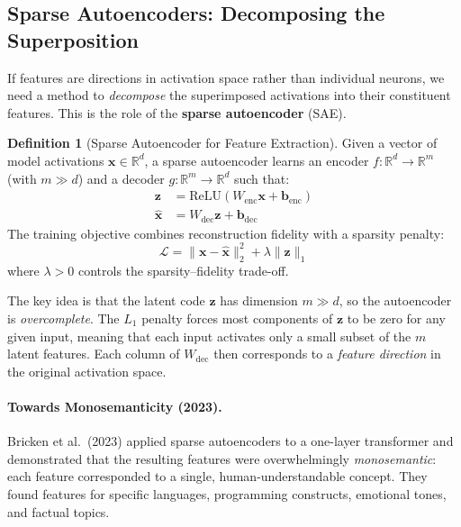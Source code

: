 \documentclass[11pt, a4paper]{article}
\theoremstyle{definition}
\newtheorem{definition}{Definition}[section]
\theoremstyle{plain}
\begin{document}
\subsection{Sparse Autoencoders: Decomposing the Superposition}
\label{sec:sae}

If features are directions in activation space rather than individual
neurons, we need a method to \emph{decompose} the superimposed
activations into their constituent features.  This is the role of the
\textbf{sparse autoencoder} (SAE).

\begin{definition}[Sparse Autoencoder for Feature Extraction]
Given a vector of model activations $\mathbf{x} \in \mathbb{R}^d$, a
sparse autoencoder learns an encoder $f: \mathbb{R}^d \to \mathbb{R}^m$
(with $m \gg d$) and a decoder $g: \mathbb{R}^m \to \mathbb{R}^d$ such
that:
\begin{align}
  \mathbf{z} &= \text{ReLU}(W_{\text{enc}} \mathbf{x} + \mathbf{b}_{\text{enc}})
  \label{eq:sae_enc} \\
  \hat{\mathbf{x}} &= W_{\text{dec}} \mathbf{z} + \mathbf{b}_{\text{dec}}
  \label{eq:sae_dec}
\end{align}
The training objective combines reconstruction fidelity with a sparsity
penalty:
\begin{equation}
  \mathcal{L} = \|\mathbf{x} - \hat{\mathbf{x}}\|_2^2
  + \lambda \|\mathbf{z}\|_1
  \label{eq:sae_loss}
\end{equation}
where $\lambda > 0$ controls the sparsity--fidelity trade-off.
\end{definition}

The key idea is that the latent code $\mathbf{z}$ has dimension $m \gg d$,
so the autoencoder is \emph{overcomplete}.  The $L_1$ penalty forces most
components of $\mathbf{z}$ to be zero for any given input, meaning that
each input activates only a small subset of the $m$ latent features.  Each
column of $W_{\text{dec}}$ then corresponds to a \emph{feature direction}
in the original activation space.

\paragraph{Towards Monosemanticity (2023).}
Bricken et al.\ (2023) applied sparse autoencoders to a one-layer
transformer and demonstrated that the resulting features were
overwhelmingly \emph{monosemantic}: each feature corresponded to a single,
human-understandable concept.  They found features for specific languages,
programming constructs, emotional tones, and factual topics.
\end{document}
